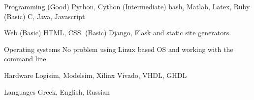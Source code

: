 


\begin{cvskills}


\cvskill
{Programming} %
{(Good) Python, Cython (Intermediate) bash, Matlab, Latex, Ruby (Basic) C, Java, Javascript} %


\cvskill
{Web} %
{(Basic) HTML, CSS. (Basic) Django, Flask and static site generators.} %


\cvskill
{Operating systems} %
{No problem using Linux based OS and working with the command line.} %


\cvskill
{Hardware} %
{Logisim, Modelsim, Xilinx Vivado, VHDL, GHDL} %


\cvskill
{Languages} %
{Greek, English, Russian} %

\end{cvskills}
